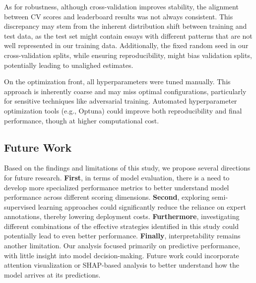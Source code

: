 \documentclass[12pt]{article}
\begin{document}
As for robustness, although cross-validation improves stability, the alignment between CV scores and leaderboard results was not always consistent. This discrepancy may stem from the inherent distribution shift between training and test data, as the test set might contain essays with different patterns that are not well represented in our training data. Additionally, the fixed random seed in our cross-validation splits, while ensuring reproducibility, might bias validation splits, potentially leading to unalighed estimates.

On the optimization front, all hyperparameters were tuned manually. This approach is inherently coarse and may miss optimal configurations, particularly for sensitive techniques like adversarial training. Automated hyperparameter optimization tools (e.g., Optuna) could improve both reproducibility and final performance, though at higher computational cost.


\subsection{Future Work}

Based on the findings and limitations of this study, we propose several directions for future research. \textbf{First}, in terms of model evaluation, there is a need to develop more specialized performance metrics to better understand model performance across different scoring dimensions. \textbf{Second}, exploring semi-supervised learning approaches could significantly reduce the reliance on expert annotations, thereby lowering deployment costs. \textbf{Furthermore}, investigating different combinations of the effective strategies identified in this study could potentially lead to even better performance. \textbf{Finally}, interpretability remains another limitation. Our analysis focused primarily on predictive performance, with little insight into model decision-making. Future work could incorporate attention visualization or SHAP-based analysis to better understand how the model arrives at its predictions.
\end{document}
